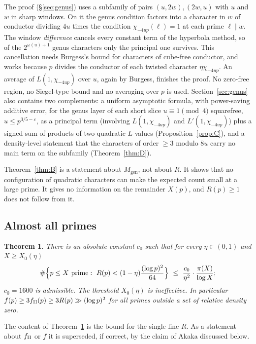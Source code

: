 \documentclass[11pt,reqno]{amsart}
\newtheorem{introthm}{Theorem}
\theoremstyle{definition}
\newcommand{\eps}{\varepsilon}
\newcommand{\Mgen}{M_{\mathrm{gen}}}
\begin{document}
The proof (\S\ref{sec:genus}) uses a subfamily of pairs
$(u,2w),(2w,u)$ with $u$ and $w$ in sharp windows.  On it the genus
condition factors into a character in $w$ of conductor dividing $4u$
times the condition $\chi_{-4up}(\ell)=1$ at each prime $\ell\mid w$.  The
window \emph{difference} cancels every constant term of the hyperbola
method, so of the $2^{\omega(u)+1}$ genus characters only the principal
one survives.  This cancellation needs Burgess's bound for characters of
cube-free conductor, and works because $p$ divides the conductor of
each twisted character $\eta\chi_{-4up}$.  An average of
$L(1,\chi_{-4up})$ over $u$, again by Burgess, finishes the proof.  No
zero-free region, no Siegel-type bound and no averaging over $p$ is used.
Section~\ref{sec:genus} also contains two complements: a uniform
asymptotic formula, with power-saving additive error, for the genus
layer of each short slice $u\equiv1\pmod 4$ squarefree, $u\le p^{3/5-\eps}$,
as a principal term (involving $L(1,\chi_{-4up})$ and $L'(1,\chi_{-4up})$) plus a
signed sum of products of two quadratic $L$-values
(Proposition~\ref{prop:C}), and a density-level
statement that the characters of order $\ge3$ modulo $8u$ carry no main
term on the subfamily (Theorem~\ref{thm:D}).

Theorem~\ref{thm:B} is a statement about $\Mgen$, not about $R$.  It
shows that no configuration of quadratic characters can make the
expected count small at a large prime.  It gives no information on the
remainder $X(p)$, and $R(p)\ge1$ does not follow from it.

\subsection{Almost all primes}
\begin{introthm}\label{thm:C}
There is an absolute constant $c_0$ such that for every
$\eta\in(0,1)$ and $X\ge X_0(\eta)$
\[
 \#\Bigl\{p\le X\ \text{prime}:\ R(p)<(1-\eta)\frac{(\log p)^2}{64}\Bigr\}
 \ \le\ \frac{c_0}{\eta^2}\cdot\frac{\pi(X)}{\log X};
\]
$c_0=1600$ is admissible.  The threshold $X_0(\eta)$ is ineffective.
In particular $f(p)\ge 3f_{\rm II}(p)\ge 3R(p)\gg(\log p)^2$ for all
primes outside a set of relative density zero.
\end{introthm}

The content of Theorem~\ref{thm:C} is the bound for the single line
$R$.  As a statement about $f_{\rm II}$ or $f$ it is superseded, if
correct, by the claim of Akaka \cite[Thm.~1]{Akaka} discussed below.
\end{document}
